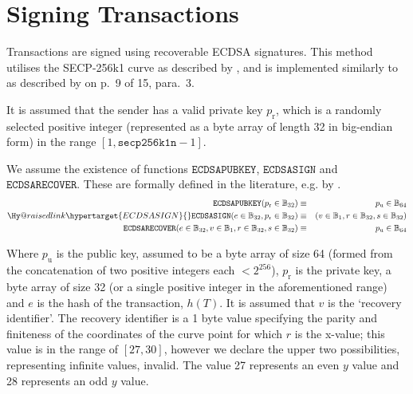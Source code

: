 \documentclass[9pt,oneside]{amsart}
\makeatletter
\newcommand{\linkdest}[1]{\Hy@raisedlink{\hypertarget{#1}{}}}
\newcommand*\eg{e.g.\@\xspace}
\makeatother
\begin{document}
\section{Signing Transactions}\label{app:signing}

Transactions are signed using recoverable ECDSA signatures. This method utilises the SECP-256k1 curve as described by \cite{Courtois2014}, and is implemented similarly to as described by \cite{gura2004comparing} on p.~9 of 15, para.~3.

It is assumed that the sender has a valid private key $p_{\mathrm{r}}$, which is a randomly selected positive integer (represented as a byte array of length 32 in big-endian form) in the range \hbox{$[1, \mathtt{secp256k1n} - 1]$}.

We assume the existence of functions $\mathtt{ECDSAPUBKEY}$, $\mathtt{ECDSASIGN}$ and $\mathtt{ECDSARECOVER}$. These are formally defined in the literature, \eg by \cite{ECDSAcerticom}.
\begin{eqnarray}
\mathtt{ECDSAPUBKEY}(p_{\mathrm{r}} \in \mathbb{B}_{32}) & \equiv & p_{\mathrm{u}} \in \mathbb{B}_{64} \\
\linkdest{ECDSASIGN}\mathtt{ECDSASIGN}(e \in \mathbb{B}_{32}, p_{\mathrm{r}} \in \mathbb{B}_{32}) & \equiv & (v \in \mathbb{B}_{1}, r \in \mathbb{B}_{32}, s \in \mathbb{B}_{32}) \\
\mathtt{ECDSARECOVER}(e \in \mathbb{B}_{32}, v \in \mathbb{B}_{1}, r \in \mathbb{B}_{32}, s \in \mathbb{B}_{32}) & \equiv & p_{\mathrm{u}} \in \mathbb{B}_{64}
\end{eqnarray}

Where $p_{\mathrm{u}}$ is the public key, assumed to be a byte array of size 64 (formed from the concatenation of two positive integers each $< 2^{256}$), $p_{\mathrm{r}}$ is the private key, a byte array of size 32 (or a single positive integer in the aforementioned range) and $e$ is the hash of the transaction, \hyperlink{h_of_T}{$h(T)$}. It is assumed that \hypertarget{v}{}$v$ is the `recovery identifier'. The recovery identifier is a 1 byte value specifying the parity and finiteness of the coordinates of the curve point for which $r$ is the x-value; this value is in the range of $[27, 30]$, however we declare the upper two possibilities, representing infinite values, invalid. The value 27 represents an even $y$ value and 28 represents an odd $y$ value.

\newcommand{\slimit}{\ensuremath{\text{s-limit}}}
\end{document}
